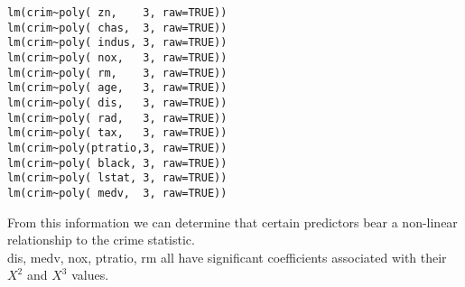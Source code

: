 \documentclass[a4paper,man,natbib]{apa6}
\begin{document}
\begin{verbatim}
lm(crim~poly( zn,    3, raw=TRUE))
lm(crim~poly( chas,  3, raw=TRUE))
lm(crim~poly( indus, 3, raw=TRUE))
lm(crim~poly( nox,   3, raw=TRUE))
lm(crim~poly( rm,    3, raw=TRUE))
lm(crim~poly( age,   3, raw=TRUE))
lm(crim~poly( dis,   3, raw=TRUE))
lm(crim~poly( rad,   3, raw=TRUE))
lm(crim~poly( tax,   3, raw=TRUE))
lm(crim~poly(ptratio,3, raw=TRUE))
lm(crim~poly( black, 3, raw=TRUE))
lm(crim~poly( lstat, 3, raw=TRUE))
lm(crim~poly( medv,  3, raw=TRUE))
\end{verbatim}
		
From this information we can determine that certain predictors bear a non-linear relationship to the crime statistic. \\
dis, medv, nox, ptratio, rm all have significant coefficients associated with their $X^2$ and $X^3$ values.
	
\end{document}
